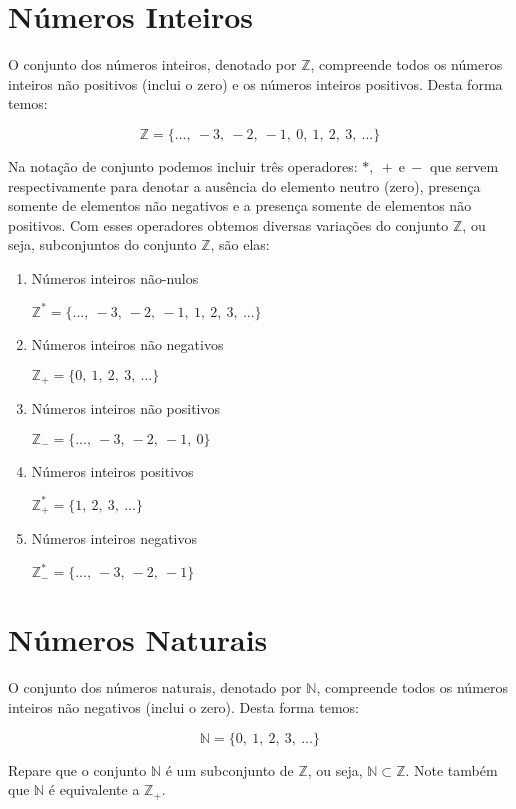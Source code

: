 \documentclass[]{book}
\begin{document}
\section{Números Inteiros}\label{numeros-inteiros}

O conjunto dos números inteiros, denotado por \(\mathbb{Z}\), compreende
todos os números inteiros não positivos (inclui o zero) e os números
inteiros positivos. Desta forma temos:

\[\mathbb{Z} = \{ ...,\ -3,\ -2,\ -1,\ 0,\ 1,\ 2,\ 3,\ ... \}\]

Na notação de conjunto podemos incluir três operadores:
\(*,\ + \ \text{e} \ -\) que servem respectivamente para denotar a
ausência do elemento neutro (zero), presença somente de elementos não
negativos e a presença somente de elementos não positivos. Com esses
operadores obtemos diversas variações do conjunto \(\mathbb{Z}\), ou
seja, subconjuntos do conjunto \(\mathbb{Z}\), são elas:

\begin{enumerate}
\def\labelenumi{\arabic{enumi}.}
\item
  Números inteiros não-nulos

  \(\mathbb{Z}^{*} = \{...,\ -3,\ -2,\ -1,\ 1,\ 2,\ 3,\ ... \}\)
\item
  Números inteiros não negativos

  \(\mathbb{Z}_{+} = \{0,\ 1,\ 2,\ 3,\ ... \}\)
\item
  Números inteiros não positivos

  \(\mathbb{Z}_{-} = \{...,\ -3,\ -2,\ -1,\ 0 \}\)
\item
  Números inteiros positivos

  \(\mathbb{Z}_{+}^{*} = \{ 1,\ 2,\ 3,\ ... \}\)
\item
  Números inteiros negativos

  \(\mathbb{Z}_{-}^{*} = \{...,\ -3,\ -2,\ -1 \}\)
\end{enumerate}

\section{Números Naturais}\label{numeros-naturais}

O conjunto dos números naturais, denotado por \(\mathbb{N}\), compreende
todos os números inteiros não negativos (inclui o zero). Desta forma
temos:

\[\mathbb{N} = \{ 0,\ 1,\ 2,\ 3,\ ... \}\]

Repare que o conjunto \(\mathbb{N}\) é um subconjunto de \(\mathbb{Z}\),
ou seja, \(\mathbb{N} \subset \mathbb{Z}\). Note também que
\(\mathbb{N}\) é equivalente a \(\mathbb{Z}_{+}\).
\end{document}
